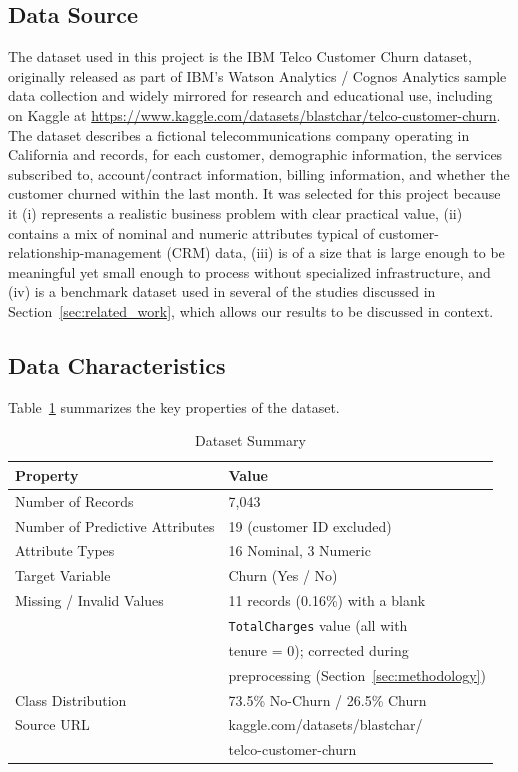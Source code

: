 \documentclass[conference]{IEEEtran}
\begin{document}
	\subsection{Data Source}
	The dataset used in this project is the IBM Telco Customer Churn dataset, originally released as part of IBM's Watson Analytics / Cognos Analytics sample data collection and widely mirrored for research and educational use, including on Kaggle at \url{https://www.kaggle.com/datasets/blastchar/telco-customer-churn}. The dataset describes a fictional telecommunications company operating in California and records, for each customer, demographic information, the services subscribed to, account/contract information, billing information, and whether the customer churned within the last month. It was selected for this project because it (i) represents a realistic business problem with clear practical value, (ii) contains a mix of nominal and numeric attributes typical of customer-relationship-management (CRM) data, (iii) is of a size that is large enough to be meaningful yet small enough to process without specialized infrastructure, and (iv) is a benchmark dataset used in several of the studies discussed in Section~\ref{sec:related_work}, which allows our results to be discussed in context.
	
	\subsection{Data Characteristics}
	Table~\ref{tab:dataset} summarizes the key properties of the dataset.
	
	\begin{table}[htbp]
		\caption{Dataset Summary}
		\begin{center}
			\begin{tabular}{|l|l|}
				\hline
				\textbf{Property} & \textbf{Value} \\
				\hline
				Number of Records & 7{,}043 \\
				\hline
				Number of Predictive Attributes & 19 (customer ID excluded) \\
				\hline
				Attribute Types & 16 Nominal, 3 Numeric \\
				\hline
				Target Variable & Churn (Yes / No) \\
				\hline
				Missing / Invalid Values & 11 records (0.16\%) with a blank \\
				& \texttt{TotalCharges} value (all with \\
				& tenure = 0); corrected during \\
				& preprocessing (Section~\ref{sec:methodology}) \\
				\hline
				Class Distribution & 73.5\% No-Churn / 26.5\% Churn \\
				\hline
				Source URL & kaggle.com/datasets/blastchar/ \\
				& telco-customer-churn \\
				\hline
			\end{tabular}
			\label{tab:dataset}
		\end{center}
	\end{table}
	
\end{document}
